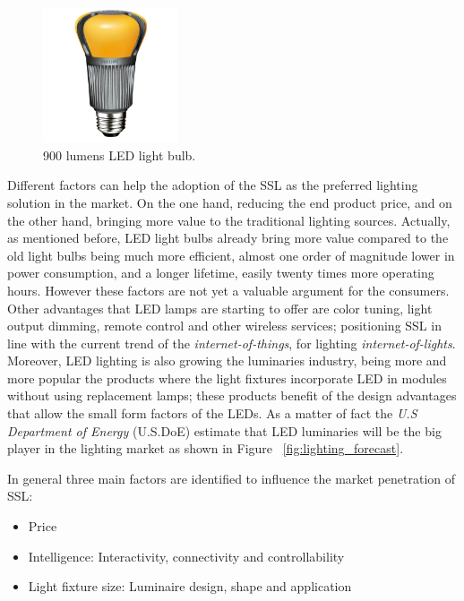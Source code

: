 \vspace{5mm} %


\begin{figure}[!h]
\centering
\includegraphics[width=4cm]{./0_intro/img/enduraled-12w.jpg}
\caption{900 lumens LED light bulb.}
\label{fig:l_prize}
\end{figure}

Different factors can help the adoption of the SSL as the preferred lighting solution in the market. On the one hand, reducing the end product price, and on the other hand, bringing more value to the traditional lighting sources. Actually, as mentioned before, LED light bulbs already bring more value compared to the old light bulbs being much more efficient, almost one order of magnitude lower in power consumption, and a longer lifetime, easily twenty times more operating hours. However these factors are not yet a valuable argument for the consumers. Other advantages that LED lamps are starting to offer are color tuning, light output dimming, remote control and other wireless services; positioning SSL in line with the current trend of the \emph{internet-of-things}, for lighting \emph{internet-of-lights}. Moreover, LED lighting is also growing the luminaries industry, being more and more popular the products where the light fixtures incorporate LED in modules without using replacement lamps; these products benefit of the design advantages that allow the small form factors of the LEDs. As a matter of fact the \emph{U.S Department of Energy} (U.S.DoE) estimate that LED luminaries will be the big player in the lighting market as shown in Figure ~\ref{fig:lighting_forecast}.

In general three main factors are identified to influence the market penetration of SSL:
\begin{itemize}
  \item Price
  \item Intelligence: Interactivity, connectivity and controllability\
  \item Light fixture size: Luminaire design, shape and application
\end{itemize}

